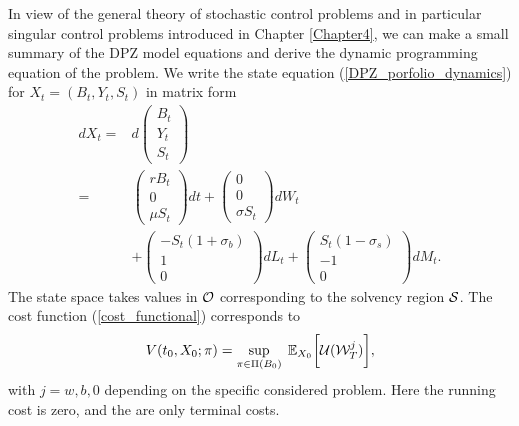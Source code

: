 In view of the general theory of stochastic control problems and in particular singular control problems introduced in Chapter \ref{Chapter4}, we can make a small summary of the 
DPZ model equations and derive the dynamic programming equation of the problem.
We write the state equation (\ref{DPZ_porfolio_dynamics}) for $X_t = (B_t,Y_t,S_t)$ in matrix form 
\begin{align}\label{DPZ_porfolio_dynamicsM}
d X_t
=& 
 d \left(
\begin{array}{l}
B_t\\
Y_t\\
S_t
\end{array} \right) \\ \nonumber
  =&  \left( \begin{array}{l}
r B_t\\
0\\
\mu S_{t}
\end{array} \right)
dt +  \left( \begin{array}{l}
0\\
0\\
\sigma S_{t}
\end{array} \right) dW_t \\ \nonumber
&+ \left( \begin{array}{l}
-S_{t}(1+\sigma_b) \\
1\\
0
\end{array} \right) dL_t
+ \left( \begin{array}{l}
S_{t}(1-\sigma_s) \\
-1\\
0
\end{array} \right) dM_t.
\end{align}
The state space takes values in $\mathcal{O}$ corresponding to the solvency region $\mathcal{S}$.
The cost function (\ref{cost_functional}) corresponds to 
\begin{equation}
V(t_0,X_0; \pi) = \sup_{\pi \in \Pi(B_0)} \;  \mathbb{E}_{X_0}\biggl[ 
            \mathcal{U}(\mathcal{W}^j_T) \biggr], 
\end{equation}
with $j=w,b,0$ depending on the specific considered problem. Here the running cost is zero, and the are only terminal costs. 

